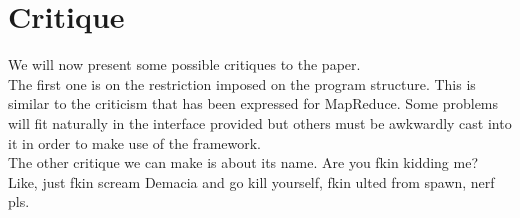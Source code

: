 \documentclass[]{article}
\begin{document}
\section{Critique}
We will now present some possible critiques to the paper.\\
The first one is on the restriction imposed on the program structure. This is similar to the criticism that has been expressed for MapReduce. Some problems will fit naturally in the interface provided but others must be awkwardly cast into it in order to make use of the framework.\\

\noindent The other critique we can make is about its name. Are you fkin kidding me? Like, just fkin scream Demacia and go kill yourself, fkin ulted from spawn, nerf pls.
\end{document}
